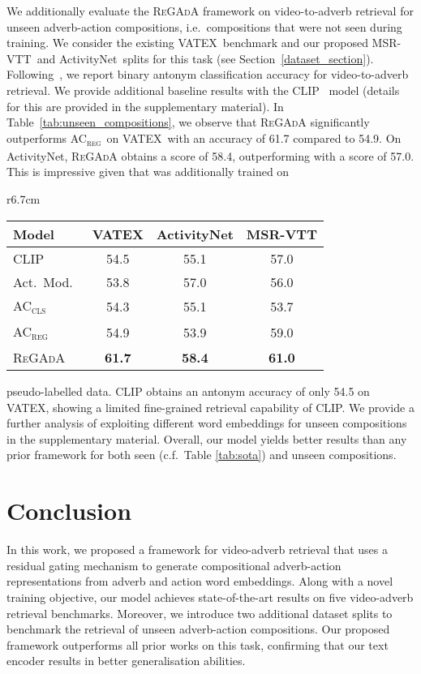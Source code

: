 \documentclass[table]{bmvc2k}
\newcommand{\modelName}{\textsc{ReGAdA}\xspace}
\newcommand{\vatex}{VATEX}
\newcommand{\msrvtt}{MSR-VTT}
\newcommand{\anet}{ActivityNet}
\newcommand{\accls}{AC\textsubscript{\textsc{cls}}}
\newcommand{\acreg}{AC\textsubscript{\textsc{reg}}}
\begin{document}
We additionally evaluate the \modelName framework on video-to-adverb retrieval for unseen adverb-action compositions, i.e.\ compositions that were not seen during training. 
We consider the existing \vatex\ benchmark and our proposed \msrvtt\ and \anet\ splits for this task (see Section~\ref{dataset_section}).
Following~\cite{doughty_how_2022}, we report binary antonym classification accuracy for video-to-adverb retrieval.
We provide additional baseline results with the CLIP~\cite{radford2021learning} model (details for this are provided in the supplementary material).
In Table~\ref{tab:unseen_compositions}, we observe that \modelName significantly outperforms \acreg\  on \vatex\ with an accuracy of 61.7 compared to 54.9. 
On \anet, \modelName obtains a score of 58.4, outperforming \cite{doughty_how_2022} with a score of 57.0. 
This is impressive given that \cite{doughty_how_2022} was additionally trained on 
\begin{wraptable}{r}{6.7cm}
\centering
\scriptsize
\begin{tabular}{l|ccc}
\toprule
\textbf{Model} & VATEX & ActivityNet & MSR-VTT \\
\midrule
CLIP~\cite{radford2021learning} & 54.5 & 55.1 & 57.0 \\
Act.~Mod.~\cite{doughty_how_2022} & 53.8  & 57.0 & 56.0\\
\accls~\cite{moltisanti2023learning} &54.3 & 55.1 & 53.7  \\
\acreg~\cite{moltisanti2023learning} &54.9 & 53.9 & 59.0  \\
\modelName & \bf 61.7 & \bf 58.4 & \bf 61.0 \\
\bottomrule
\end{tabular}
\vspace{1.2em}
\caption{Retrieval of unseen adverb-action compositions on the \vatex, \anet\ and \msrvtt\ benchmarks. \cite{doughty_how_2022} uses pseudo-labelling.}
\label{tab:unseen_compositions}
\end{wraptable}
pseudo-labelled data.
CLIP obtains an antonym accuracy of only 54.5 on \vatex, showing  a limited fine-grained retrieval capability of CLIP.
We provide a further analysis of exploiting different word embeddings for unseen compositions in the supplementary material.
Overall, our model yields better results than any prior framework for both seen (c.f.\ Table \ref{tab:sota}) and unseen compositions. 

\section{Conclusion}
In this work, we proposed a framework for video-adverb retrieval that uses a residual gating mechanism to generate compositional adverb-action representations from adverb and action word embeddings. Along with a novel training objective, our model achieves state-of-the-art results on five video-adverb retrieval benchmarks. 
Moreover, we introduce two additional dataset splits to benchmark the retrieval of unseen adverb-action compositions. Our proposed framework outperforms all prior works on this task, confirming that our text encoder results in better generalisation abilities.
\end{document}
